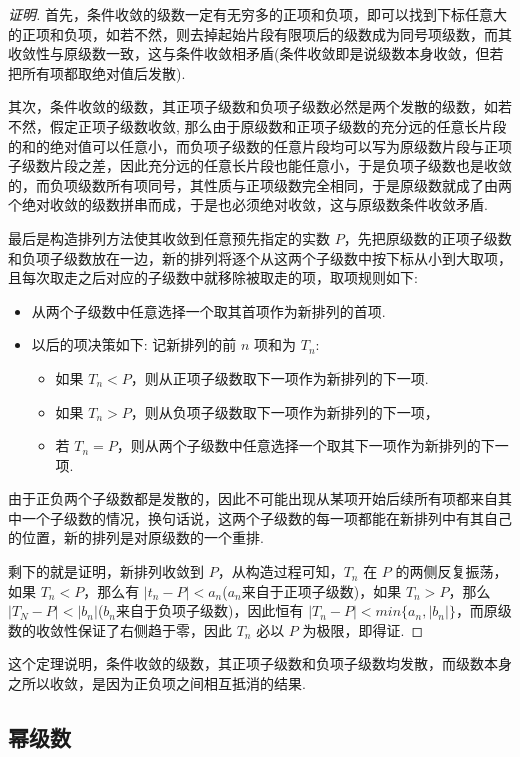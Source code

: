 \begin{proof}[证明]
 首先，条件收敛的级数一定有无穷多的正项和负项，即可以找到下标任意大的正项和负项，如若不然，则去掉起始片段有限项后的级数成为同号项级数，而其收敛性与原级数一致，这与条件收敛相矛盾(条件收敛即是说级数本身收敛，但若把所有项都取绝对值后发散).

 其次，条件收敛的级数，其正项子级数和负项子级数必然是两个发散的级数，如若不然，假定正项子级数收敛, 那么由于原级数和正项子级数的充分远的任意长片段的和的绝对值可以任意小，而负项子级数的任意片段均可以写为原级数片段与正项子级数片段之差，因此充分远的任意长片段也能任意小，于是负项子级数也是收敛的，而负项级数所有项同号，其性质与正项级数完全相同，于是原级数就成了由两个绝对收敛的级数拼串而成，于是也必须绝对收敛，这与原级数条件收敛矛盾.

 最后是构造排列方法使其收敛到任意预先指定的实数 $P$，先把原级数的正项子级数和负项子级数放在一边，新的排列将逐个从这两个子级数中按下标从小到大取项，且每次取走之后对应的子级数中就移除被取走的项，取项规则如下:
 \begin{itemize}
 \item 从两个子级数中任意选择一个取其首项作为新排列的首项.
 \item 以后的项决策如下: 记新排列的前 $n$ 项和为 $T_n$:
   \begin{itemize}
   \item 如果 $T_n<P$，则从正项子级数取下一项作为新排列的下一项.
   \item 如果 $T_n>P$，则从负项子级数取下一项作为新排列的下一项，
   \item 若 $T_n=P$，则从两个子级数中任意选择一个取其下一项作为新排列的下一项.
   \end{itemize}
 \end{itemize}
 由于正负两个子级数都是发散的，因此不可能出现从某项开始后续所有项都来自其中一个子级数的情况，换句话说，这两个子级数的每一项都能在新排列中有其自己的位置，新的排列是对原级数的一个重排.

 剩下的就是证明，新排列收敛到 $P$，从构造过程可知，$T_n$ 在 $P$ 的两侧反复振荡，如果 $T_n<P$，那么有 $|t_n-P|<a_n$($a_n$来自于正项子级数)，如果 $T_n>P$，那么 $|T_N-P|<|b_n|$($b_n$来自于负项子级数)，因此恒有 $|T_n-P|<min\{a_n,|b_n|\}$，而原级数的收敛性保证了右侧趋于零，因此 $T_n$ 必以 $P$ 为极限，即得证.
\end{proof}

这个定理说明，条件收敛的级数，其正项子级数和负项子级数均发散，而级数本身之所以收敛，是因为正负项之间相互抵消的结果.

\subsection{幂级数}
\label{sec:power-series}

